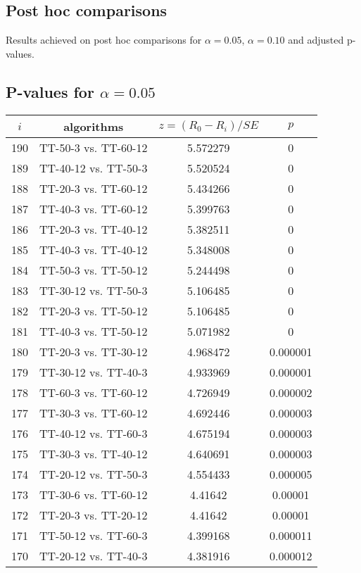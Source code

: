 \documentclass[a4paper,10pt]{article}
\begin{document}
\begin{landscape}
\pagebreak

\section{Post hoc comparisons}

Results achieved on post hoc comparisons for $\alpha = 0.05$, $\alpha = 0.10$ and adjusted p-values.

\subsection{P-values for $\alpha=0.05$}

\begin{table}[!htp]
\centering\scriptsize
\begin{tabular}{cccc}
$i$&algorithms&$z=(R_0 - R_i)/SE$&$p$\\
\hline190&TT-50-3 vs. TT-60-12&5.572279&0\\
189&TT-40-12 vs. TT-50-3&5.520524&0\\
188&TT-20-3 vs. TT-60-12&5.434266&0\\
187&TT-40-3 vs. TT-60-12&5.399763&0\\
186&TT-20-3 vs. TT-40-12&5.382511&0\\
185&TT-40-3 vs. TT-40-12&5.348008&0\\
184&TT-50-3 vs. TT-50-12&5.244498&0\\
183&TT-30-12 vs. TT-50-3&5.106485&0\\
182&TT-20-3 vs. TT-50-12&5.106485&0\\
181&TT-40-3 vs. TT-50-12&5.071982&0\\
180&TT-20-3 vs. TT-30-12&4.968472&0.000001\\
179&TT-30-12 vs. TT-40-3&4.933969&0.000001\\
178&TT-60-3 vs. TT-60-12&4.726949&0.000002\\
177&TT-30-3 vs. TT-60-12&4.692446&0.000003\\
176&TT-40-12 vs. TT-60-3&4.675194&0.000003\\
175&TT-30-3 vs. TT-40-12&4.640691&0.000003\\
174&TT-20-12 vs. TT-50-3&4.554433&0.000005\\
173&TT-30-6 vs. TT-60-12&4.41642&0.00001\\
172&TT-20-3 vs. TT-20-12&4.41642&0.00001\\
171&TT-50-12 vs. TT-60-3&4.399168&0.000011\\
170&TT-20-12 vs. TT-40-3&4.381916&0.000012\\

\end{tabular}
\end{table}
\end{landscape}
\end{document}
